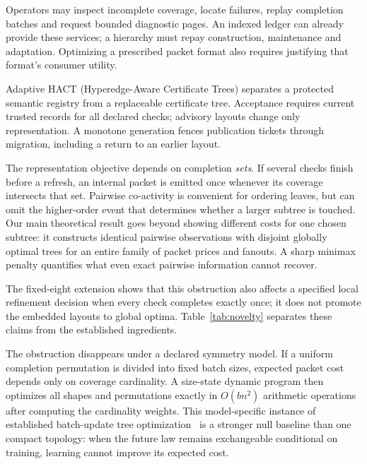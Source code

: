 \documentclass[preprint,12pt]{elsarticle}
\theoremstyle{definition}\newtheorem{definition}[theorem]{Definition}
\begin{document}
Operators may inspect incomplete coverage, locate failures, replay completion
batches and request bounded diagnostic pages. An indexed ledger can already
provide these services; a hierarchy must repay construction, maintenance and
adaptation. Optimizing a prescribed packet format also requires justifying
that format's consumer utility.

Adaptive HACT (Hyperedge-Aware Certificate Trees) separates a protected
semantic registry from a replaceable certificate tree. Acceptance requires
current trusted records for all declared checks; advisory layouts change
only representation. A monotone generation fences publication tickets
through migration, including a return to an earlier layout.

The representation objective depends on completion \emph{sets}. If several
checks finish before a refresh, an internal packet is emitted once whenever
its coverage intersects that set. Pairwise co-activity is convenient for
ordering leaves, but can omit the higher-order event that determines whether
a larger subtree is touched. Our main theoretical result goes beyond
showing different costs for one chosen subtree: it constructs identical
pairwise observations with disjoint globally optimal trees for an entire
family of packet prices and fanouts. A sharp minimax penalty quantifies
what even exact pairwise information cannot recover.

The fixed-eight extension shows that this obstruction also affects a
specified local refinement decision when every check completes exactly once;
it does not promote the embedded layouts to global optima. Table~\ref{tab:novelty}
separates these claims from the established ingredients.

The obstruction disappears under a declared symmetry model. If a uniform
completion permutation is divided into fixed batch sizes, expected packet
cost depends only on coverage cardinality. A size-state dynamic program
then optimizes all shapes and permutations exactly in $O(bn^2)$ arithmetic
operations after computing the cardinality weights. This model-specific instance of established batch-update tree
optimization~\cite{graham2007} is a stronger null baseline than one compact
topology: when the future law remains exchangeable conditional on training,
learning cannot improve its expected cost.
\end{document}

